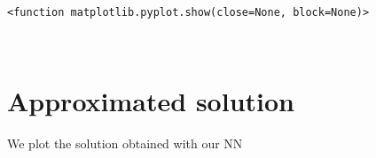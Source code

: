 \documentclass[11pt]{article}
\makeatletter
\newcommand{\boxspacing}{\kern\kvtcb@left@rule\kern\kvtcb@boxsep}
\newcommand{\prompt}[4]{
        {\ttfamily\llap{{\color{#2}[#3]:\hspace{3pt}#4}}\vspace{-\baselineskip}}
    }
\makeatother
\begin{document}
            \begin{tcolorbox}[breakable, size=fbox, boxrule=.5pt, pad at break*=1mm, opacityfill=0]
\prompt{Out}{outcolor}{51}{\boxspacing}
\begin{Verbatim}[commandchars=\\\{\}]
<function matplotlib.pyplot.show(close=None, block=None)>
\end{Verbatim}
\end{tcolorbox}
        
    \begin{center}
    \end{center}
    { \hspace*{\fill} \\}
    
    \hypertarget{approximated-solution}{%
\section{Approximated solution}\label{approximated-solution}}

We plot the solution obtained with our NN
\end{document}
